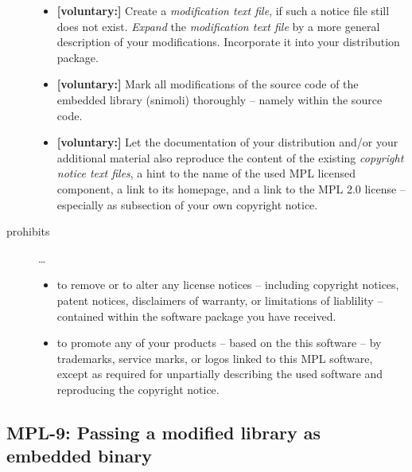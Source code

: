 \begin{description}
\begin{itemize}
  \item \textbf{[voluntary:]} Create a \emph{modification text file}, if such a
  notice file still does not exist. \emph{Expand} the \emph{modification text
  file} by a more general description of your modifications. Incorporate it into
  your distribution package.
  
  \item \textbf{[voluntary:]} Mark all modifications of the source code of the
  embedded library (snimoli) thoroughly -- namely within the source code.
      
  \item \textbf{[voluntary:]} Let the documentation of your distribution and/or
  your additional material also reproduce the content of the existing
  \emph{copyright notice text files}, a hint to the name of the used MPL
  licensed component, a link to its homepage, and a link to the MPL 2.0 license
  -- especially as subsection of your own copyright notice.
 
\end{itemize}

\item[prohibits] \ldots
\begin{itemize}
  \item to remove or to alter any license notices -- including copyright
  notices, patent notices, disclaimers of warranty, or limitations of liablility
  -- contained within the software package you have received.
  \item to promote any of your products -- based on the this software -- by
  trademarks, service marks, or logos linked to this MPL software, except as
  required for unpartially describing the used software and reproducing the
  copyright notice.
\end{itemize}

\end{description}


\subsection{MPL-9: Passing a modified library as embedded binary}

